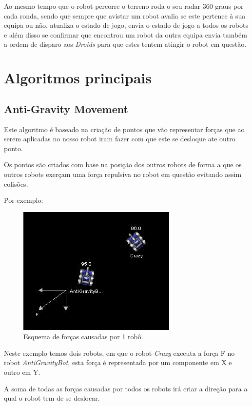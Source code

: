 Ao mesmo tempo que o robot percorre o terreno roda o seu radar 360 graus por cada ronda, sendo que sempre que avistar um robot avalia se este pertence à sua equipa ou não, atualiza o estado de jogo, envia o estado de jogo a todos os robots e além disso se confirmar que encontrou um robot da outra equipa envia também  a ordem de disparo aos \textit{Droids} para que estes tentem atingir o robot em questão.




\section{Algoritmos principais}

\subsection{Anti-Gravity Movement}
Este algoritmo é baseado na criação de pontos que vão representar forças que ao serem aplicadas no nosso robot iram fazer com que este se desloque ate outro ponto.

Os pontos são criados com base na posição dos outros robots de forma a que os outros robots exerçam uma força repulsiva no robot em questão evitando assim colisões.

Por exemplo:

\begin{figure}[H]
    \centering
    \includegraphics[scale=0.6]{Imagens/force.png}
    \caption{Esquema de forças causadas por 1 robô.}
    \label{fig:forca}
\end{figure}

Neste exemplo temos dois robots, em que o robot \textit{Crazy} executa a força F no robot \textit{AntiGravityBot}, esta força é representada por um componente em X e outro em Y.

A soma de todas as forças causadas por todos os robots irá criar a direção para a qual o robot tem de se deslocar.

